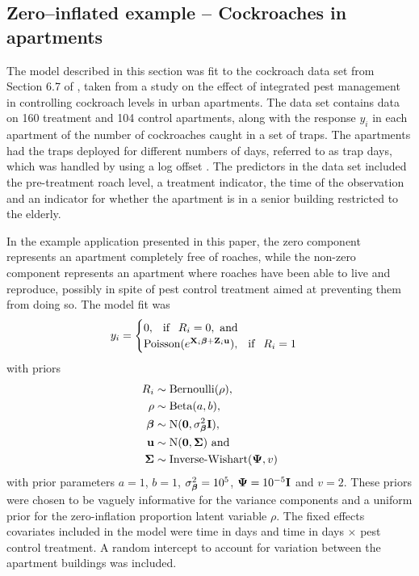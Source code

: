 \subsection{Zero--inflated example -- Cockroaches in apartments}
\label{sec:cockroaches} The model described in this section was fit  to the
cockroach data set from Section 6.7 of \cite{Gelman2007}, taken from a study on
the effect of integrated pest management in controlling cockroach levels in
urban apartments. The data set contains data on 160 treatment and 104 control
apartments, along with the response $y_i$ in each apartment of the number of
cockroaches caught in a set of traps. The apartments had the traps deployed for
different numbers of days, referred to as trap days, which was handled by using
a log offset \cite{Agresti2002}. The predictors in the data set included the
pre-treatment roach level, a treatment indicator, the time of the observation
and an indicator for whether the apartment is in a senior building restricted
to the elderly.
		
In the example application presented in this paper, the zero component
represents an apartment completely free of roaches, while the non-zero
component represents an apartment where roaches have been able to live and
reproduce, possibly in spite of pest control treatment aimed at preventing them
from doing so. The model fit was
$$
	y_i = \begin{cases}
	0, \phantom{-} \text{if} \phantom{-} R_i = 0, \text{ and } \\
	\text{Poisson}(e^{{\bf X}_i {\boldsymbol \beta} + {\bf Z}_i {\bf u}}), \phantom{-} \text{if} \phantom{-} R_i = 1
	\end{cases}
$$
with priors
\begin{align*}
	R_i &\sim \text{Bernoulli}(\rho), \\
	\rho &\sim \text{Beta}(a, b), \quad\\
	{\boldsymbol \beta} &\sim \text{N}({\bf 0}, \sigma^2_{\boldsymbol \beta} {\bf I}), \\
	{\bf u} &\sim \text{N}({\bf 0}, {\boldsymbol \Sigma}) \text{ and } \\
	{\boldsymbol \Sigma} &\sim \text{Inverse-Wishart}({\boldsymbol \Psi}, v)
\end{align*}
with prior parameters $a = 1$, $b = 1$, $\sigma^2_{\boldsymbol \beta} = 10^5$, ${\boldsymbol \Psi} =
10^{-5} {\bf I}$ and $v = 2$.  These priors were chosen to be vaguely informative
for the variance components and a uniform prior for the zero-inflation
proportion latent variable $\rho$. The fixed effects covariates included in the
model were time in days and time in days $\times$ pest control treatment. A
random intercept to account for variation between the apartment buildings was
included.
		
